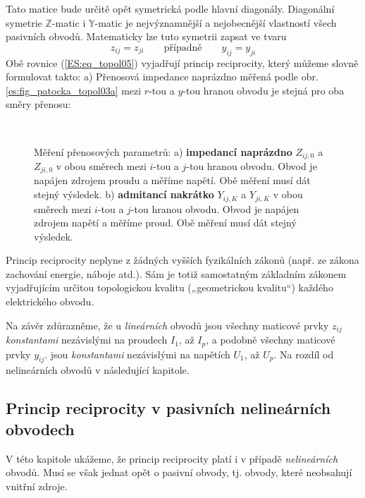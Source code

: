       Tato matice bude určitě opět symetrická podle hlavní diagonály. Diagonální symetrie 
      \(\mathbb{Z}\)-matic i \(\mathbb{Y}\)-matic je nejvýznamnější a nejobecnější vlastností všech 
      pasivních obvodů. Matematicky lze tuto symetrii zapsat ve tvaru
      \begin{equation}\label{ES:eq_topol05}
        z_{ij} = z_{ji} \qquad\text{případně}\qquad y_{ij} = y_{ji}
      \end{equation}
      Obě rovnice (\ref{ES:eq_topol05}) vyjadřují princip reciprocity, který můžeme slovně 
      formulovat takto: a) Přenosová impedance naprázdno měřená podle obr. 
      \ref{es:fig_patocka_topol03a} mezi \(r\)-tou a \(y\)-tou hranou obvodu je stejná pro oba 
      směry přenosu:
      \begin{figure}[ht!]
        \centering  
           \\
        \caption{Měření přenosových parametrů: a) \textbf{impedancí naprázdno} \(Z_{ij,0}\) a 
                 \(Z_{ji,0}\) v obou směrech mezi \(i\)-tou a \(j\)-tou hranou obvodu. Obvod je 
                 napájen zdrojem proudu a měříme napětí. Obě měření musí dát stejný výsledek. b)  
                 \textbf{admitancí nakrátko} \(Y_{ij,K}\) a \(Y_{ji,K}\) v obou směrech mezi 
                 \(i\)-tou a \(j\)-tou hranou obvodu. Obvod je napájen zdrojem napětí a měříme 
                 proud. Obě měření musí dát stejný výsledek. \cite[s.~45]{Patocka4}} 
        \label{es:fig_patocka_topol03}
      \end{figure}
      
      Princip reciprocity neplyne z žádných vyšších fyzikálních zákonů (např. ze zákona zachování 
      energie, náboje atd.). Sám je totiž samostatným základním zákonem vyjadřujícím určitou 
      topologickou kvalitu („geometrickou kvalitu“) každého elektrického obvodu.
      
      Na závěr zdůrazněme, že u \emph{lineárních} obvodů jsou všechny maticové prvky \(z_{ij}\) 
      \emph{konstantami} nezávislými na proudech \(I_1\), až \(I_p\), a podobně všechny maticové 
      prvky \(y_{ij}\). jsou \emph{konstantami} nezávislými na napětích \(U_1\), až \(U_p\). Na 
      rozdíl od nelineárních obvodů v následující kapitole.
      
    \subsection{Princip reciprocity v pasivních nelineárních obvodech}\label{teo:IchapIIIsecIsubIII}
      V této kapitole ukážeme, že princip reciprocity platí i v případě \emph{nelineárních} obvodů. 
      Musí se však jednat opět o pasivní obvody, tj. obvody, které neobsahují vnitřní zdroje.
      
